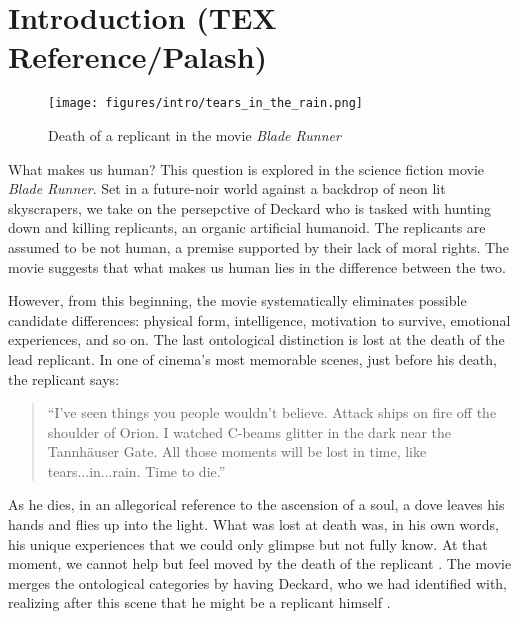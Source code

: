 


\chapter{Introduction (TEX Reference/Palash)}
\label{chap_intro_ref}


   \begin{figure}[thpb]
      \centering
      \texttt{[image: figures/intro/tears\_in\_the\_rain.png]}
      \caption{Death of a replicant in the movie \textit{Blade Runner}}
      \label{fig_ec_story_no_story_lm}
   \end{figure}


What makes us human? This question is explored in the science fiction movie \textit{Blade Runner}. Set in a future-noir world against a backdrop of neon lit skyscrapers, we take on the persepctive of Deckard who is tasked with hunting down and killing replicants, an organic artificial humanoid. The replicants are assumed to be not human, a premise supported by their lack of moral rights. The movie suggests that what makes us human lies in the difference between the two. 

However, from this beginning, the movie systematically eliminates possible candidate differences: physical form, intelligence, motivation to survive, emotional experiences, and so on. The last ontological distinction is lost at the death of the lead replicant. In one of cinema's most memorable scenes, just before his death, the replicant says:

\begin{quotation}

``I've seen things you people wouldn't believe. Attack ships on fire off the shoulder of Orion. I watched C-beams glitter in the dark near the Tannh\"{a}user Gate. All those moments will be lost in time, like tears...in...rain. Time to die.''

\end{quotation}

As he dies, in an allegorical reference to the ascension of a soul, a dove leaves his hands and flies up into the light. What was lost at death was, in his own words, his unique experiences that we could only glimpse but not fully know. At that moment, we cannot help but feel moved by the death of the replicant \cite{rowlands_philosopher_end_universe}. The movie merges the ontological categories by having Deckard, who we had identified with, realizing after this scene that he might be a replicant himself \cite{mulhall_blade_runner}. 


